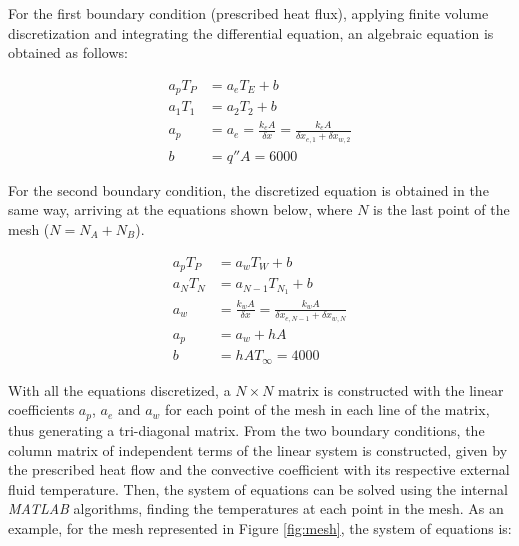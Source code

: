 For the first boundary condition (prescribed heat flux), applying finite volume discretization and integrating the differential equation, an algebraic equation is obtained as follows:

\begin{align*}
    a_p T_P &= a_e T_E + b \\
    a_1 T_1 &= a_2 T_2 + b \\
    a_p &= a_e = \frac{k_e A}{\delta x} = \frac{k_e A}{\delta x_{e,1} + \delta x_{w,2}} \\
    b &= q'' A = 6000
\end{align*}

For the second boundary condition, the discretized equation is obtained in the same way, arriving at the equations shown below, where $N$ is the last point of the mesh ($N = N_A + N_B$).

\begin{align*}
    a_p T_P &= a_w T_W + b \\
    a_N T_N &= a_{N-1} T_{N_1} + b \\
    a_w &= \frac{k_w A}{\delta x} = \frac{k_w A}{\delta x_{e,N-1} + \delta x_{w,N}} \\
    a_p &= a_w + h A \\
    b &= h A T_\infty = 4000
\end{align*}

With all the equations discretized, a $N \times N$ matrix is constructed with the linear coefficients $a_p$, $a_e$ and $a_w$ for each point of the mesh in each line of the matrix, thus generating a tri-diagonal matrix.
From the two boundary conditions, the column matrix of independent terms of the linear system is constructed, given by the prescribed heat flow and the convective coefficient with its respective external fluid temperature.
Then, the system of equations can be solved using the internal \emph{MATLAB} algorithms, finding the temperatures at each point in the mesh.
As an example, for the mesh represented in Figure \ref{fig:mesh}, the system of equations is:


